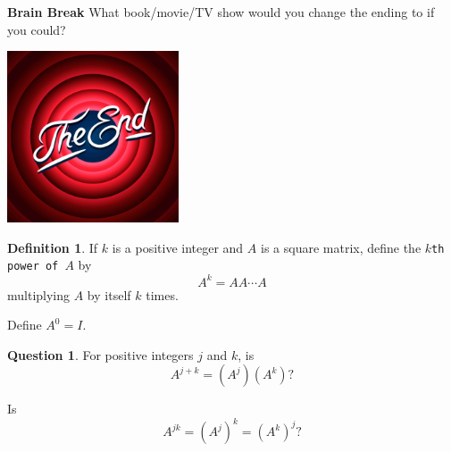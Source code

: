 \documentclass[handout]{beamer}
\newcommand{\fn}{\insertframenumber}
\theoremstyle{definition}
\newtheorem{question}[exercise]{Question}
\newtheorem*{defn}{Definition}
\renewcommand{\emph}[1]{{\color{blue}\texttt{#1}}}
\begin{document}
\begin{frame}{\fn}
	\begin{block}{\textbf{Brain Break}}
		What book/movie/TV show would you change the ending to if you could?
		\begin{center}
		\includegraphics[width=2in]{../images/end}
		\end{center}
	\end{block}
\end{frame}
\begin{frame}{\fn}
	\begin{defn}
		If $k$ is a positive integer and $A$ is a square matrix, define the \emph{$k$th power of $A$} by
		\[A^k=AA\cdots A\]
		multiplying $A$ by itself $k$ times.
		
		Define $A^0=I$.
		
	\end{defn}
	\begin{question}
		For positive integers $j$ and $k$, is $$A^{j+k}=(A^j)(A^k)?$$ 
		
		Is $$A^{jk}=(A^j)^k=(A^k)^j?$$
	\end{question}
\end{frame}
\end{document}
